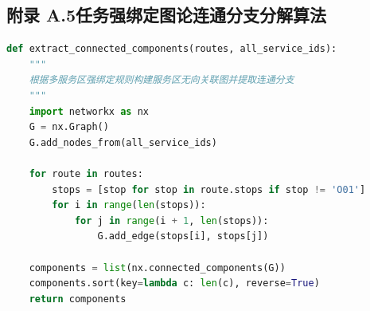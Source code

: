 \subsection*{附录 A.5\quad 任务强绑定图论连通分支分解算法}

\begin{lstlisting}[language=Python]
def extract_connected_components(routes, all_service_ids):
    """
    根据多服务区强绑定规则构建服务区无向关联图并提取连通分支
    """
    import networkx as nx
    G = nx.Graph()
    G.add_nodes_from(all_service_ids)
    
    for route in routes:
        stops = [stop for stop in route.stops if stop != 'O01']
        for i in range(len(stops)):
            for j in range(i + 1, len(stops)):
                G.add_edge(stops[i], stops[j])
                
    components = list(nx.connected_components(G))
    components.sort(key=lambda c: len(c), reverse=True)
    return components
\end{lstlisting}
